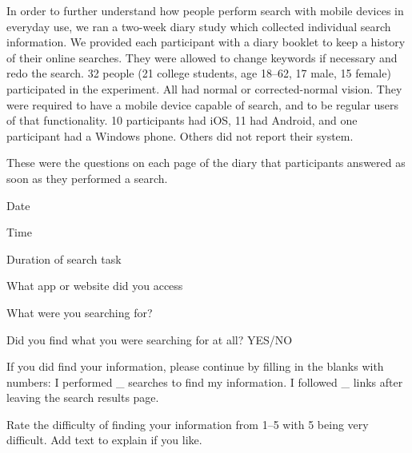 
In order to further understand how people perform search with mobile devices in everyday use, we ran a two-week diary study which collected individual search information. We provided each participant with a diary booklet to keep a history of their online searches. They were allowed to change keywords if necessary and redo the search. 32 people (21 college students, age 18--62, 17 male, 15 female) participated in the experiment. All had normal or corrected-normal vision. They were required to have a mobile device capable of search, and to be regular users of that functionality. 10 participants had iOS, 11 had Android, and one participant had a Windows phone. Others did not report their system.




%
These were the questions on each page of the diary that participants answered as soon as they performed a search.
\begin{tight_enumerate}
            \item Date
            \item Time
            \item Duration of search task 
            \item What app or website did you access
            \item What were you searching for?
            \item Did you find what you were searching for at all? YES/NO
            \item If you did find your information, please continue by filling in the blanks with numbers: I performed \_ searches to find my information. I followed \_ links after leaving the search results page.
            \item Rate the difficulty of finding your information from 1--5 with 5 being very difficult. Add text to explain if you like.
\end{tight_enumerate}


